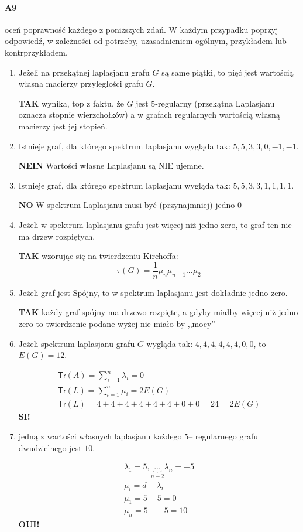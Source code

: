 \paragraph{A9} oceń poprawność każdego z poniższych zdań. W każdym przypadku poprzyj odpowiedź, w zależności od potrzeby, uzasadnieniem ogólnym, przykładem lub kontrprzykładem.
\begin{enumerate}[label=\alph*)]
\item Jeżeli na przekątnej laplasjanu grafu $G$ są same piątki, to pięć jest wartością własna macierzy przyległości grafu $G$.

\textbf{TAK} wynika, top z faktu, że $G$ jest $5$-regularny (przekątna Laplasjanu oznacza stopnie wierzchołków) a w grafach regularnych wartością własną macierzy jest jej stopień. 
\item Istnieje graf, dla którego spektrum laplasjanu wygląda tak: $5,5,3,3,0,-1,-1$.

\textbf{NEIN} Wartości własne Laplasjanu są NIE ujemne.
\item Istnieje graf, dla którego spektrum laplasjanu wygląda tak: $5,5,3,3,1,1,1,1$.

\textbf{NO} W spektrum Laplasjanu musi być (przynajmniej) jedno $0$
\item Jeżeli w spektrum laplasjanu grafu jest więcej niż jedno zero, to graf ten nie ma drzew rozpiętych.

\textbf{TAK} wzorując się na twierdzeniu Kirchoffa: $$\tau (G)=\frac{1}{n}\mu _n\mu_{n-1}...\mu _2$$
\item Jeżeli graf jest Spójny, to w spektrum laplasjanu jest dokładnie jedno zero.

\textbf{TAK} każdy graf spójny ma drzewo rozpięte, a gdyby miałby więcej niż jedno zero to twierdzenie podane wyżej nie miało by ,,mocy''
\item Jeżeli spektrum laplasjanu grafu $G$ wygląda tak: $4,4,4,4,4,4,0,0$, to $E(G) = 12$.

\begin{align*}
\mathsf{Tr}(A)=\sum _{i=1}^n \lambda _i = 0\\
\mathsf{Tr}(L)=\sum _{i=1}^n \mu _i = 2E(G)\\
\mathsf{Tr}(L)=4+4+4+4+4+4+0+0=24 = 2E(G)
\end{align*}
\textbf{SI!}
\item jedną z wartości własnych laplasjanu każdego $5$– regularnego grafu dwudzielnego jest $10$.

\begin{align*}
\lambda _1 = 5, \underbrace{...}_{n-2} \lambda _n = -5\\
\mu _i = d-\lambda _i\\
\mu _1 = 5-5 = 0\\
\mu _n = 5--5=10
\end{align*}
\textbf{OUI!}
\end{enumerate}

